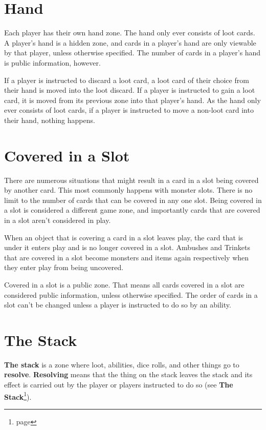\documentclass[a4paper, twoside]{report} %
\begin{document}
    \section{Hand}
    Each player has their own hand zone. The hand only ever consists of loot cards. A player’s hand is a hidden zone, and cards in a player’s hand are only viewable by that player, unless otherwise specified. The number of cards in a player’s hand is public information, however.

    If a player is instructed to discard a loot card, a loot card of their choice from their hand is moved into the loot discard. If a player is instructed to gain a loot card, it is moved from its previous zone into that player’s hand. As the hand only ever consists of loot cards, if a player is instructed to move a non-loot card into their hand, nothing happens.

    \section{Covered in a Slot}
    There are numerous situations that might result in a card in a slot being covered by another card. This most commonly happens with monster slots. There is no limit to the number of cards that can be covered in any one slot. Being covered in a slot is considered a different game zone, and importantly cards that are covered in a slot aren’t considered in play.

    When an object that is covering a card in a slot leaves play, the card that is under it enters play and is no longer covered in a slot. Ambushes and Trinkets that are covered in a slot become monsters and items again respectively when they enter play from being uncovered.

    Covered in a slot is a public zone. That means all cards covered in a slot are considered public information, unless otherwise specified. The order of cards in a slot can’t be changed unless a player is instructed to do so by an ability.

    \section{The Stack}
    \textbf{The stack} is a zone where loot, abilities, dice rolls, and other things go to \textbf{resolve}. \textbf{Resolving} means that the thing on the stack leaves the stack and its effect is carried out by the player or players instructed to do so (see \textbf{The Stack}\footnote{page \pageref{stack}}).
\end{document}
